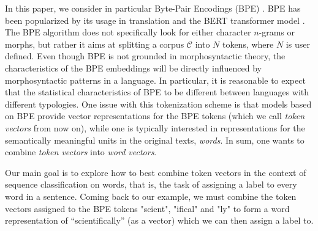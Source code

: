 \documentclass[11pt]{article}
\newcommand\citep{\cite}
\begin{document}
        In this paper, we consider in particular Byte-Pair Encodings
     (BPE) \citep{sennrich2015neural}.  BPE has been popularized by
     its usage in translation and the BERT transformer model
     \citep{devlin2018bert}.  The BPE algorithm does not specifically
     look for either character $n$-grams or morphs, but rather it aims
     at splitting a corpus $\mathcal{C}$ into $N$ tokens, where $N$ is
     user defined.
    Even though BPE is not grounded in morphosyntactic theory, the
     characteristics of the BPE embeddings will be directly influenced
     by morphosyntactic patterns in a language. In particular, it is
     reasonable to expect that the statistical characteristics of BPE
     to be different between languages with different typologies.
     One issue with this tokenization scheme is that models based on
     BPE provide vector representations for the BPE tokens (which we
     call \emph{token vectors} from now on), while one is typically
     interested in representations for the semantically meaningful
     units in the original texts, \emph{words}. In sum,
     one wants to combine \emph{token vectors} into
     \emph{word vectors}.

     Our main goal is to explore how to best combine token vectors  in
     the context of sequence classification on words, that is, the
     task of assigning a label to every word in a sentence.
      Coming back to our example, we must combine the token vectors
     assigned to the BPE tokens "scient", "ifical" and "ly" to form a
     word representation of ``scientifically'' (as a vector) which we can then assign a
     label to.

\end{document}
